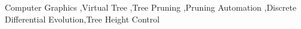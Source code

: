 \begin{keyword}
Computer Graphics \sep Virtual Tree  \sep Tree Pruning \sep Pruning Automation \sep Discrete Differential Evolution\sep Tree Height Control
\end{keyword}
